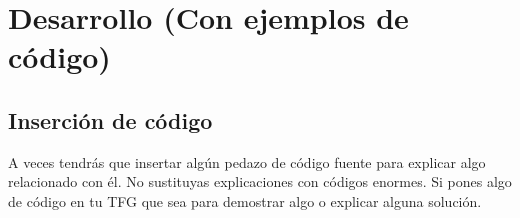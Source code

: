 
\chapter{Desarrollo (Con ejemplos de código)}
\label{desarrollo}

\section{Inserción de código}
A veces tendrás que insertar algún pedazo de código fuente para explicar algo relacionado con él. No sustituyas explicaciones con códigos enormes. Si pones algo de código en tu TFG que sea para demostrar algo o explicar alguna solución.





